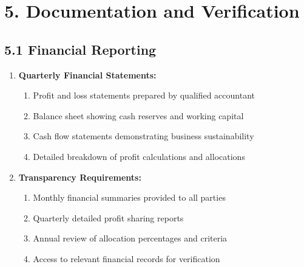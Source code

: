 \section*{5. Documentation and Verification}

\subsection*{5.1 Financial Reporting}
\begin{enumerate}[label=\arabic*.]
\item \textbf{Quarterly Financial Statements:}
    \begin{enumerate}[label=(\alph*)]
    \item Profit and loss statements prepared by qualified accountant
    \item Balance sheet showing cash reserves and working capital
    \item Cash flow statements demonstrating business sustainability
    \item Detailed breakdown of profit calculations and allocations
    \end{enumerate}

\item \textbf{Transparency Requirements:}
    \begin{enumerate}[label=(\alph*)]
    \item Monthly financial summaries provided to all parties
    \item Quarterly detailed profit sharing reports
    \item Annual review of allocation percentages and criteria
    \item Access to relevant financial records for verification
    \end{enumerate}
\end{enumerate}

